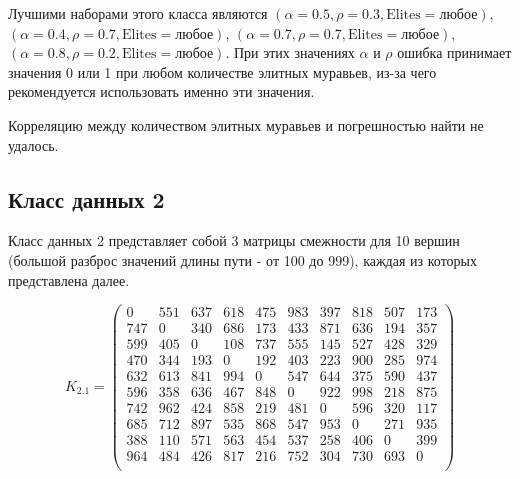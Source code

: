 Лучшими наборами этого класса являются $(\alpha = 0.5, \rho = 0.3, \text{Elites} = \text{любое})$, $(\alpha = 0.4, \rho = 0.7, \text{Elites} = \text{любое})$, $(\alpha = 0.7, \rho = 0.7, \text{Elites} = \text{любое})$, $(\alpha = 0.8, \rho = 0.2, \text{Elites} = \text{любое})$.
При этих значениях $\alpha$ и $\rho$ ошибка принимает значения 0 или 1 при любом количестве элитных муравьев, из-за чего рекомендуется использовать именно эти значения.

Корреляцию между количеством элитных муравьев и погрешностью найти не удалось.

\subsection{Класс данных 2}\label{par:class2}

Класс данных 2 представляет собой 3 матрицы смежности для 10 вершин (большой разброс значений длины пути - от 100 до 999), каждая из которых представлена далее.

\begin{equation}
	\label{eq:kd2.1}
	K_{2.1} = \begin{pmatrix}
		0 & 551 & 637 & 618 & 475 & 983 & 397 & 818 & 507 & 173 \\
		747 & 0 & 340 & 686 & 173 & 433 & 871 & 636 & 194 & 357 \\
		599 & 405 & 0 & 108 & 737 & 555 & 145 & 527 & 428 & 329 \\
		470 & 344 & 193 & 0 & 192 & 403 & 223 & 900 & 285 & 974 \\
		632 & 613 & 841 & 994 & 0 & 547 & 644 & 375 & 590 & 437 \\
		596 & 358 & 636 & 467 & 848 & 0 & 922 & 998 & 218 & 875 \\
		742 & 962 & 424 & 858 & 219 & 481 & 0 & 596 & 320 & 117 \\
		685 & 712 & 897 & 535 & 868 & 547 & 953 & 0 & 271 & 935 \\
		388 & 110 & 571 & 563 & 454 & 537 & 258 & 406 & 0 & 399 \\
		964 & 484 & 426 & 817 & 216 & 752 & 304 & 730 & 693 & 0 \\
	\end{pmatrix}
\end{equation}

